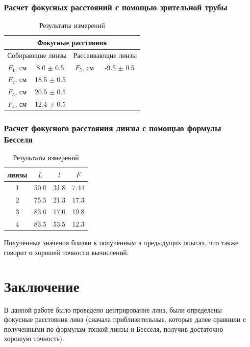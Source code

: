 \documentclass[
a4paper, %
12pt, %
]{article}
\begin{document}
	\subsubsection{Расчет фокусных расстояний с помощью зрительной трубы}
	
	\begin{table}[h]
		\centering
		\begin{tabular}[H]{|c|c|c|c|}
			\hline
			\multicolumn{4}{|c|}{Фокусные расстояния} \\
			\hline
			
			\hline
			\multicolumn{2}{|c|}{Собирающие линзы} & \multicolumn{2}{|c|}{Рассеивающие линзы} \\
			\hline
			
			\hline
			$F_1$, см & 8.0 $\pm$ 0.5 & $F_5$, см & -9.5 $\pm$ 0.5 \\
			\hline
			$F_2$, см & 18.5 $\pm$ 0.5 & & \\
			\hline
			$F_3$, см & 20.5 $\pm$ 0.5 & & \\
			\hline	
			$F_4$, см & 12.4 $\pm$ 0.5 & & \\
			\hline
		\end{tabular}
		\caption{Результаты измерений}
	\end{table}
	
	\subsubsection{Расчет фокусного расстояния линзы с помощью формулы Бесселя}
	
	\begin{table}[h!]
		\centering
		\begin{tabular}[H]{|c|c|c|c|}
			\hline
			\textnumero\; линзы & $L$ & $l$ & $F$\\
			\hline
			1 & 50.0 & 31.8 & 7.44 \\
			\hline
			2 & 75.5 & 21.3 & 17.3 \\
			\hline
			3 & 83.0 & 17.0 & 19.8 \\
			\hline	
			4 & 83.5 & 53.5 & 12.3 \\
			\hline
		\end{tabular}
		\caption{Результаты измерений}
	\end{table}
	
	Полученные значения близки к полученным в предыдущих опытах, что также говорит о хорошей точности вычислений.
		
	\section{Заключение}
	В данной работе было проведено центрирование линз, были определены фокусные
	расстояния линз (сначала приблизительные, которые далее сравнили с полученными
	по формулам тонкой линзы и Бесселя, получив достаточно хорошую точность).
	
\end{document}
